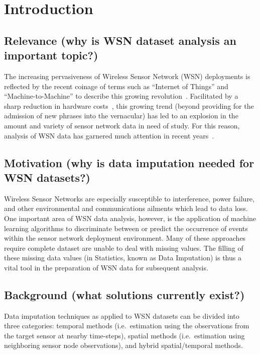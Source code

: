 \documentclass[10pt]{sigplan-proc-varsize-sensys11}
\begin{document}

\section{Introduction}

\subsection{Relevance (why is WSN dataset analysis an important topic?)}
The increasing pervasiveness of Wireless Sensor Network (WSN) deployments is reflected by the recent coinage of terms such as ``Internet of Things'' and ``Machine-to-Machine'' to describe this growing revolution~\cite{ashton2009internet,gershenfeld2004internet,nokia2004machine,lawton2004machine}.
Facilitated by a sharp reduction in hardware costs~\cite{estrin2000special}, this growing trend (beyond providing for the admission of new phrases into the vernacular) has led to an explosion in the amount and variety of sensor network data in need of study.
For this reason, analysis of WSN data has garnered much attention in recent years~\cite{balazinska2007data}.

\subsection{Motivation (why is data imputation needed for WSN datasets?)}
Wireless Sensor Networks are especially susceptible to interference, power failure, and other environmental and communications ailments which lead to data loss.
One important area of WSN data analysis, however, is the application of machine learning algorithms to discriminate between or predict the occurrence of events within the sensor network deployment environment.
Many of these approaches require complete dataset are unable to deal with missing values. The filling of these missing data values (in Statistics, known as Data Imputation) is thus a vital tool in the preparation of WSN data for subsequent analysis. 

\subsection{Background (what solutions currently exist?)}
Data imputation techniques as applied to WSN datasets can be divided into three categories:
temporal methods (i.e.\ estimation using the observations from the target sensor at nearby time-steps),
spatial methods (i.e.\ estimation using neighboring sensor node observations),
and hybrid spatial/temporal methods.
\end{document}
